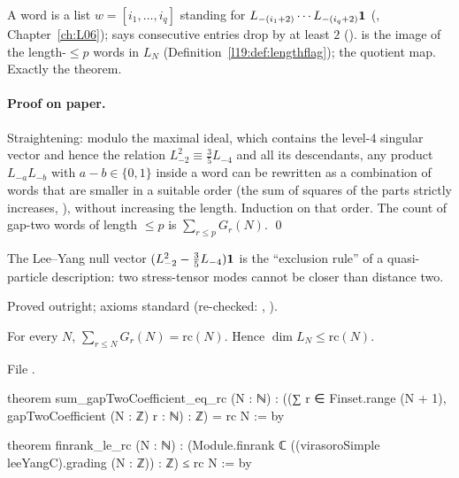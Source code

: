 \begin{dictionary}
A word is a list $w=[i_1,\dots,i_q]$ standing for $L_{-(i_1+2)}\cdots L_{-(i_q+2)}\mathbf 1$ (, Chapter~\ref{ch:L06});  says
consecutive entries drop by at least $2$ ().  is the image of the length-$\le p$ words in $L_N$
(Definition~\ref{l19:def:lengthflag});  the quotient map. Exactly the theorem.
\end{dictionary}

\paragraph{Proof on paper.} Straightening: modulo the maximal ideal, which contains the level-4 singular vector and hence the relation
$L_{-2}^2\equiv\tfrac35L_{-4}$ and all its descendants, any product $L_{-a}L_{-b}$ with $a-b\in\{0,1\}$ inside a word can be rewritten as a combination of words
that are smaller in a suitable order (the sum of squares of the parts strictly increases, ), without increasing the length. Induction on that
order. The count of gap-two words of length $\le p$ is $\sum_{r\le p}G_r(N)$. \qed

\begin{physics}
The Lee--Yang null vector $(L_{-2}^2-\tfrac35L_{-4})\mathbf 1$ is the ``exclusion rule'' of a quasi-particle description: two stress-tensor modes cannot
be closer than distance two.
\end{physics}

\begin{status}
Proved outright; axioms standard (re-checked: , ).
\end{status}

\begin{theorem}\label{l28:thm:andrews}
For every $N$, $\sum_{r\le N}G_r(N)=\mathrm{rc}(N)$. Hence $\dim L_N\le\mathrm{rc}(N)$.
\end{theorem}

\noindent File .
\begin{leancode}
theorem sum_gapTwoCoefficient_eq_rc (N : ℕ) :
    ((∑ r ∈ Finset.range (N + 1), gapTwoCoefficient (N : ℤ) r : ℕ) : ℤ) = rc N := by

theorem finrank_le_rc (N : ℕ) :
    (Module.finrank ℂ ((virasoroSimple leeYangC).grading (N : ℤ)) : ℤ) ≤ rc N := by
\end{leancode}

